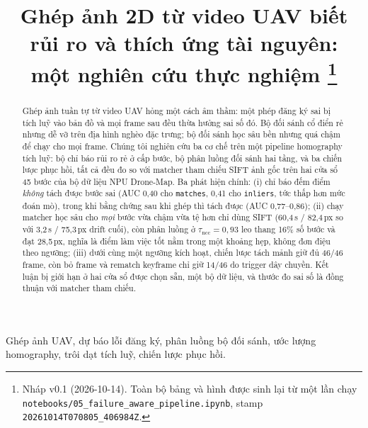\documentclass[conference]{IEEEtran}
\begin{document}
\title{Ghép ảnh 2D từ video UAV biết rủi ro và thích ứng tài nguyên:\\
một nghiên cứu thực nghiệm%
\thanks{Nháp v0.1 (2026-10-14). Toàn bộ bảng và hình được sinh lại từ một lần
chạy \texttt{notebooks/05\_failure\_aware\_pipeline.ipynb}, stamp
\texttt{20261014T070805\_406984Z}.}}

\author{
}

\maketitle

\begin{abstract}
Ghép ảnh tuần tự từ video UAV hỏng một cách âm thầm: một phép đăng ký sai bị
tích luỹ vào bản đồ và mọi frame sau đều thừa hưởng sai số đó. Bộ đối sánh cổ
điển rẻ nhưng dễ vỡ trên địa hình nghèo đặc trưng; bộ đối sánh học sâu bền
nhưng quá chậm để chạy cho mọi frame. Chúng tôi nghiên cứu ba cơ chế trên một
pipeline homography tích luỹ: bộ chỉ báo rủi ro rẻ ở cấp bước, bộ phân luồng
đối sánh hai tầng, và ba chiến lược phục hồi, tất cả đều đo so với matcher tham
chiếu SIFT ảnh gốc trên hai cửa sổ 45 bước của bộ dữ liệu NPU Drone-Map. Ba
phát hiện chính: (i) chỉ báo đếm điểm \emph{không} tách được bước sai (AUC 0,40
cho \texttt{matches}, 0,41 cho \texttt{inliers}, tức thấp hơn mức đoán mò),
trong
khi bằng chứng sau khi ghép thì tách được (AUC 0,77--0,86); (ii) chạy matcher
học sâu cho \emph{mọi} bước vừa chậm vừa tệ hơn chỉ dùng SIFT (60,4\,s /
82,4\,px so với 3,2\,s / 75,3\,px drift cuối), còn phân luồng ở
$\tau_{\mathrm{ncc}}{=}0{,}93$ leo thang 16\% số bước và đạt 28,5\,px, nghĩa là
điểm làm việc tốt nằm trong một khoảng hẹp, không đơn điệu theo ngưỡng; (iii) dưới
cùng một ngưỡng kích hoạt, chiến lược tách mảnh giữ đủ 46/46 frame, còn bỏ
frame và rematch keyframe chỉ giữ 14/46 do trigger dây chuyền. Kết luận bị giới
hạn ở hai cửa sổ được chọn sẵn, một bộ dữ liệu, và thước đo sai số là đồng
thuận với matcher tham chiếu.
\end{abstract}

\begin{IEEEkeywords}
Ghép ảnh UAV, dự báo lỗi đăng ký, phân luồng bộ đối sánh, ước lượng
homography, trôi dạt tích luỹ, chiến lược phục hồi.
\end{IEEEkeywords}
\end{document}
